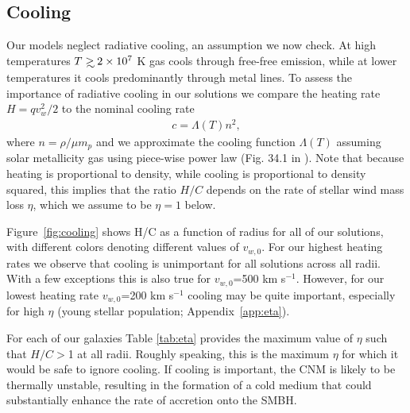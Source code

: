 \documentclass[usenatbib,fleqn]{mn2e}
\newcommand\lsim{\mathrel{\rlap{\lower4pt\hbox{\hskip1pt$\sim$}}
    \raise1pt\hbox{$<$}}}
\newcommand\gsim{\mathrel{\rlap{\lower4pt\hbox{\hskip1pt$\sim$}}
    \raise1pt\hbox{$>$}}}
\newcommand{\vw}{v_w}
\newcommand{\vwO}{v_{w,0}}
\begin{document}
\subsection{Cooling}
\label{sec:cooling}
Our models neglect radiative cooling, an assumption we now check.  At high temperatures  $T\gsim
2\times 10^7$ K gas cools through free-free emission, while at lower temperatures it cools predominantly through metal lines.  
To assess the importance of radiative cooling in our solutions we compare the heating rate $H=q
\vw^2/2$ to the nominal cooling rate
\begin{align}
  c =\Lambda(T) n^2,
\label{eq:cooling}
\end{align}
where $n = \rho/\mu m_p$ and we approximate the cooling function $\Lambda(T)$ assuming solar metallicity gas using piece-wise power law (Fig. 34.1 in \cite{Draine:2011a}).   Note that because heating is proportional to density, while cooling is proportional to density squared, this implies that the ratio $H/C$ depends on the rate of stellar wind mass loss $\eta$, which we assume to be $\eta = 1$ below.

Figure~\ref{fig:cooling} shows H/C as a function of radius for all of our solutions, with different colors denoting different values of $v_{w,0}$.  For our highest heating rates we observe that cooling is unimportant for all solutions across all radii.  With a few exceptions this is also true for $\vwO$=500 km s$^{-1}$.  However, for our lowest heating rate $\vwO$=200 km s$^{-1}$ cooling may be quite important, especially for high $\eta$ (young stellar population;  Appendix~\ref{app:eta}).  

For each of our galaxies Table \ref{tab:eta} provides the maximum value of $\eta$ such that $H/C >$1 at all radii.  Roughly speaking, this is the maximum $\eta$ for which it would be safe to ignore cooling.  If cooling is important, the CNM is likely to be thermally unstable, resulting in the formation of a cold medium that could substantially enhance the rate of accretion onto the SMBH.  

\end{document}
